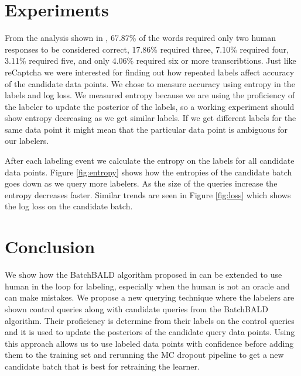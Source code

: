 \documentclass[twoside,11pt]{article}
\begin{document}
\section{Experiments}

From the analysis shown in \cite{recaptcha}, 67.87\% of the words required only two human responses to be considered correct, 17.86\% required three, 7.10\% required four, 3.11\% required five, and only 4.06\% required six or more transcribtions. Just like reCaptcha we were interested for finding out how repeated labels affect accuracy of the candidate data points. We chose to measure accuracy using entropy in the labels and log loss. We measured entropy because we are using the proficiency of the labeler to update the posterior of the labels, so a working experiment should show entropy decreasing as we get similar labels. If we get different labels for the same data point it might mean that the particular data point is ambiguous for our labelers.

After each labeling event we calculate the entropy on the labels for all candidate data points. Figure \ref{fig:entropy} shows how the entropies of the candidate batch goes down as we query more labelers. As the size of the queries increase the entropy decreases faster. Similar trends are seen in Figure \ref{fig:loss} which shows the log loss on the candidate batch.

\section{Conclusion}

We show how the BatchBALD algorithm proposed in \cite{kirsch2019batchbald} can be extended to use human in the loop for labeling, especially when the human is not an oracle and can make mistakes. We propose a new querying technique where the labelers are shown control queries along with candidate queries from the BatchBALD algorithm. Their proficiency is determine from their labels on the control queries and it is used to update the posteriors of the candidate query data points. Using this approach allows us to use labeled data points with confidence before adding them to the training set and rerunning the MC dropout pipeline to get a new candidate batch that is best for retraining the learner. 


\end{document}
